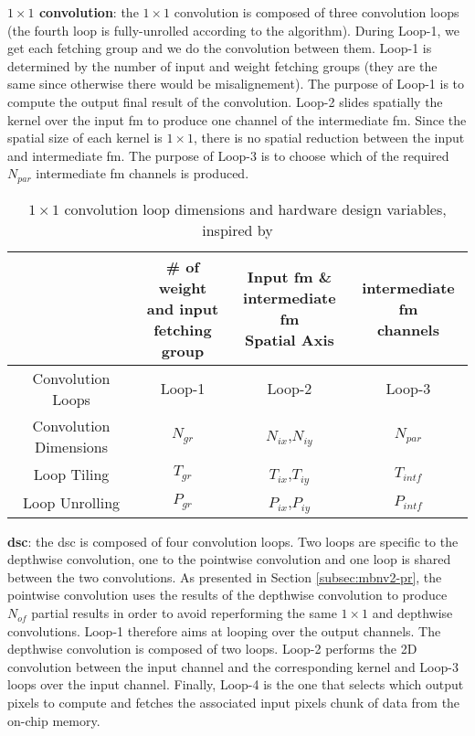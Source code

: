 \textbf{$1 \times 1$ convolution}: the $1 \times 1$ convolution is composed of three convolution loops (the fourth loop is fully-unrolled according to the algorithm). During Loop-1, we get each fetching group and we do the convolution between them. Loop-1 is determined by the number of input and weight fetching groups (they are the same since otherwise there would be misalignement). The purpose of Loop-1 is to compute the output final result of the convolution. Loop-2 slides spatially the kernel over the input \acrshort{fm} to produce one channel of the intermediate \acrshort{fm}. Since the spatial size of each kernel is $1 \times 1$, there is no spatial reduction between the input and intermediate \acrshort{fm}. The purpose of Loop-3 is to choose which of the required $N_{par}$ intermediate \acrshort{fm} channels is produced.
%
\begin{table}[H]
    \centering
    \begin{tabular}{c|c|c|c}
    \hline \hline
    & \makecell{\# of weight \\ and input \\ fetching group} & \makecell{Input \acrshort{fm} \& \\ intermediate \acrshort{fm} \\ Spatial Axis} & \makecell{intermediate \acrshort{fm} \\ channels} \\
    \hline
    Convolution Loops & Loop-1 & Loop-2 & Loop-3 \\
    Convolution Dimensions & $N_{gr}$ & $N_{ix}$,$N_{iy}$ & $N_{par}$ \\
    Loop Tiling            & $T_{gr}$ & $T_{ix}$,$T_{iy}$ & $T_{intf}$ \\
    Loop Unrolling         & $P_{gr}$ & $P_{ix}$,$P_{iy}$ & $P_{intf}$ \\
    \hline \hline
    \end{tabular}
    \caption{$1 \times 1$ convolution loop dimensions and hardware design variables, inspired by \cite{ma_optimizing_2018}}
    \label{tab:param_c11}
\end{table}
%
\textbf{\acrshort{dsc}}: the \acrshort{dsc} is composed of four convolution loops. Two loops are specific to the depthwise convolution, one to the pointwise convolution and one loop is shared between the two convolutions. As presented in Section \ref{subsec:mbnv2-pr}, the pointwise convolution uses the results of the depthwise convolution to produce $N_{of}$ partial results in order to avoid reperforming the same $1 \times 1$ and depthwise convolutions. Loop-1 therefore aims at looping over the output channels. The depthwise convolution is composed of two loops. Loop-2 performs the 2D convolution between the input channel and the corresponding kernel and Loop-3 loops over the input channel. Finally, Loop-4 is the one that selects which output pixels to compute and fetches the associated input pixels chunk of data from the on-chip memory.
